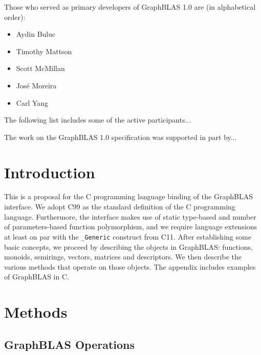 \documentclass[11pt]{extarticle}
\begin{document}
Those who served as primary developers of GraphBLAS 1.0 are (in alphabetical order):
\begin{itemize}
\item Aydin Buluc
\item Timothy Mattson
\item Scott McMillan
\item Jos\'e Moreira
\item Carl Yang
\end{itemize}

The following list includes some of the active participants...

The work on the GraphBLAS 1.0 specification was supported in part by...


\section{Introduction}

This is a proposal for the C programming language binding of the GraphBLAS
interface. We adopt C99 as the standard definition of the C programming
language. Furthermore, the interface makes use of static type-based and
number of parameters-based function polymorphism, and we require language
extensions at least on par with the {\tt \_Generic} construct from C11.
After establishing some basic concepts, we proceed by describing the
objects in GraphBLAS: functions, monoids, semirings, vectors, matrices
and descriptors. We then describe the various methods that operate on
those objects. The appendix includes examples of GraphBLAS in C.





\section{Methods}
\label{Sec:Methods}





\subsection{GraphBLAS Operations}









\appendix


%
%
\end{document}
